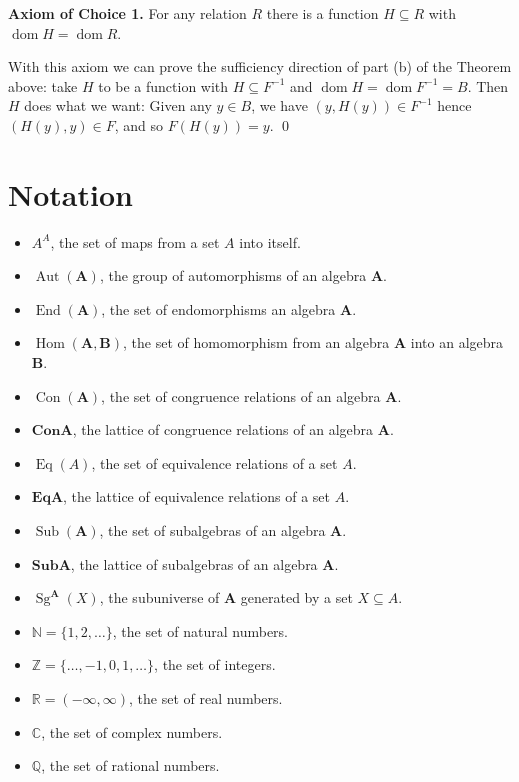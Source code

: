 \documentclass[12pt]{article}
\theoremstyle{plain}
\theoremstyle{definition}
\theoremstyle{remark}
\theoremstyle{remark}
\numberwithin{theorem}{section}
\numberwithin{equation}{section}
\newcommand{\<}{\ensuremath{\langle}}
\renewcommand{\>}{\ensuremath{\rangle}}
\newcommand{\dom}{\ensuremath{\operatorname{dom}}}   %
\newcommand{\Con}{\ensuremath{\operatorname{Con}}}
\newcommand{\bCon}{\ensuremath{\mathbf{Con}}}
\newcommand{\Sub}{\ensuremath{\operatorname{Sub}}}     %
\newcommand{\bSub}{\ensuremath{\mathbf{Sub}}}    %
\newcommand{\Sg}{\ensuremath{\operatorname{Sg}}}       %
\newcommand{\Hom}{\ensuremath{\operatorname{Hom}}}     %
\newcommand{\Aut}{\ensuremath{\operatorname{Aut}}}     %
\newcommand{\End}{\ensuremath{\operatorname{End}}}     %
\newcommand{\Eq}{\ensuremath{\operatorname{Eq}}}
\newcommand{\bEq}{\ensuremath{\mathbf{Eq}}}
\newcommand{\bA}{\ensuremath{\mathbf{A}}}
\newcommand{\bB}{\ensuremath{\mathbf{B}}}
\newcommand{\N}{\ensuremath{\mathbb{N}}}   %
\newcommand{\Z}{\ensuremath{\mathbb{Z}}}   %
\newcommand{\R}{\ensuremath{\mathbb{R}}}   %
\newcommand{\Q}{\ensuremath{\mathbb{Q}}}   %
\newcommand{\C}{\ensuremath{\mathbb{C}}}   %
\begin{document}
\noindent 
{\bf Axiom of Choice 1.} For any relation $R$ there is a function
$H \subseteq R$ with $\dom H = \dom R$.

With this axiom we can prove the sufficiency direction of part (b) of the Theorem above:
take $H$ to be a function with $H \subseteq F^{-1}$ and $\dom H = \dom F^{-1} = B$. Then
$H$ does what we want: Given any $y \in B$, we have $(y,H(y)) \in F^{-1}$ hence
$(H(y), y) \in F$, and so $F(H(y)) = y$.
\qed



\section{Notation}
\begin{itemize}
\item $A^A$, the set of maps from a set $A$ into itself.
\item $\Aut(\bA)$, the group of automorphisms of an algebra $\bA$.
\item $\End(\bA)$, the set of endomorphisms an algebra $\bA$.
\item $\Hom(\bA, \bB)$, the set of homomorphism from an algebra $\bA$ into an algebra $\bB$.
\item $\Con(\bA)$, the set of congruence relations of an algebra $\bA$.
\item $\bCon \bA$, the lattice of congruence relations of an algebra $\bA$.
\item $\Eq(A)$, the set of equivalence relations of a set $A$.
\item $\bEq \bA$, the lattice of equivalence relations of a set $A$.
\item $\Sub(\bA)$, the set of subalgebras of an algebra $\bA$.
\item $\bSub \bA$, the lattice of subalgebras of an algebra $\bA$.
\item $\Sg^\bA(X)$, the subuniverse of $\bA$ generated by a set $X\subseteq A$.
\item $\N = \{1, 2, \dots\}$, the set of natural numbers.
\item $\Z = \{\dots, -1, 0, 1, \dots\}$, the set of integers.
\item $\R = (-\infty, \infty)$, the set of real numbers.
\item $\C$, the set of complex numbers.
\item $\Q$, the set of rational numbers.
\end{itemize}



\printindex
\end{document}
